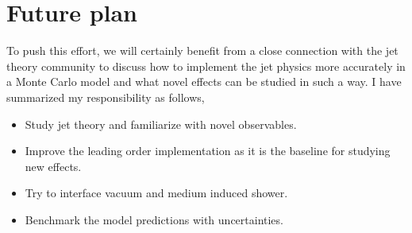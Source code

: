 \documentclass[10pt,a4paper]{article}
\begin{document}
\section{Future plan}
To push this effort, we will certainly benefit from a close connection with the jet theory community to discuss how to implement the jet physics more accurately in a Monte Carlo model and what novel effects can be studied in such a way. I have summarized my responsibility as follows,
\begin{itemize}
\item Study jet theory and familiarize with novel observables.
\item Improve the leading order implementation as it is  the baseline for studying new effects.
\item Try to interface vacuum and medium induced shower.
\item Benchmark the model predictions with uncertainties.
\end{itemize}
\end{document}
